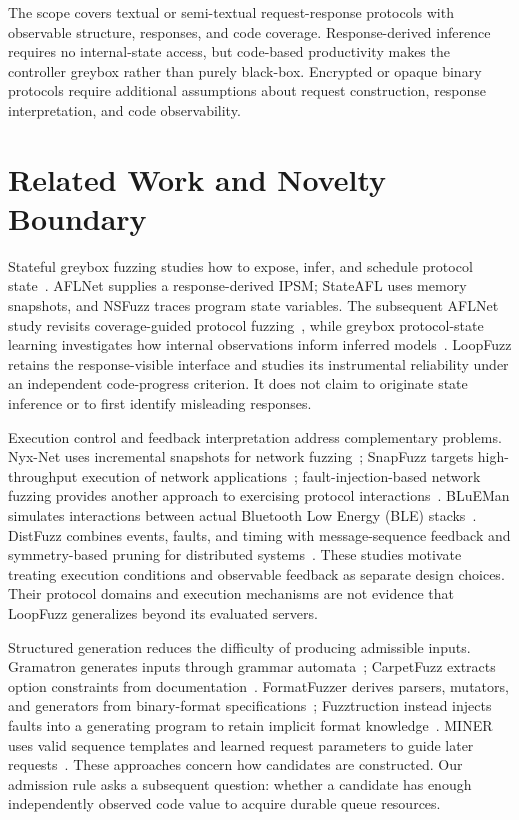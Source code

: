 \documentclass[final,5p,times,number]{elsarticle}
\begin{document}
The scope covers textual or semi-textual request-response protocols with observable structure, responses, and code coverage. Response-derived inference requires no internal-state access, but code-based productivity makes the controller greybox rather than purely black-box. Encrypted or opaque binary protocols require additional assumptions about request construction, response interpretation, and code observability.

\section{Related Work and Novelty Boundary}
Stateful greybox fuzzing studies how to expose, infer, and schedule protocol state~\cite{aflnet,stateafl,nsfuzz,sgf_usenix22}. AFLNet supplies a response-derived IPSM; StateAFL uses memory snapshots, and NSFuzz traces program state variables. The subsequent AFLNet study revisits coverage-guided protocol fuzzing~\cite{aflnet5years2025}, while greybox protocol-state learning investigates how internal observations inform inferred models~\cite{stateinspector2022}. LoopFuzz retains the response-visible interface and studies its instrumental reliability under an independent code-progress criterion. It does not claim to originate state inference or to first identify misleading responses.

Execution control and feedback interpretation address complementary problems. Nyx-Net uses incremental snapshots for network fuzzing~\cite{nyxnet2022}; SnapFuzz targets high-throughput execution of network applications~\cite{snapfuzz2022}; fault-injection-based network fuzzing provides another approach to exercising protocol interactions~\cite{fuzztructionnet2024}. BLuEMan simulates interactions between actual Bluetooth Low Energy (BLE) stacks~\cite{blueman2025}. DistFuzz combines events, faults, and timing with message-sequence feedback and symmetry-based pruning for distributed systems~\cite{distfuzz2025}. These studies motivate treating execution conditions and observable feedback as separate design choices. Their protocol domains and execution mechanisms are not evidence that LoopFuzz generalizes beyond its evaluated servers.

Structured generation reduces the difficulty of producing admissible inputs. Gramatron generates inputs through grammar automata~\cite{gramatron_effective_grammar_aware_2021}; CarpetFuzz extracts option constraints from documentation~\cite{carpetfuzz_documentation_2023}. FormatFuzzer derives parsers, mutators, and generators from binary-format specifications~\cite{formatfuzzer}; Fuzztruction instead injects faults into a generating program to retain implicit format knowledge~\cite{fuzztruction2023}. MINER uses valid sequence templates and learned request parameters to guide later requests~\cite{miner2023}. These approaches concern how candidates are constructed. Our admission rule asks a subsequent question: whether a candidate has enough independently observed code value to acquire durable queue resources.
\end{document}
